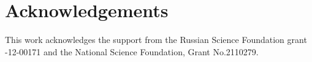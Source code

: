 \documentclass[aps,prl,twocolumn,showpacs,preprintnumbers,amsmath,amssymb,floatfix]{revtex4-2}
\begin{document}
\section{Acknowledgements}
This work acknowledges the support from the Russian Science Foundation grant -12-00171 and the National Science Foundation, Grant No.2110279.

%


\end{document}
